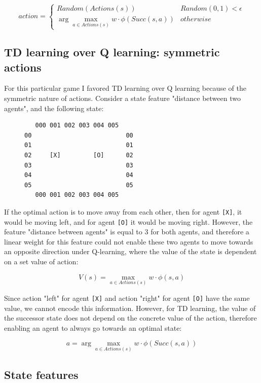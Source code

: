 \documentclass{article}
\begin{document}
\[
action = 
\begin{cases}
    Random(Actions(s)) & Random(0,1) < \epsilon \\
    \arg \max_{a\in Actions(s)} w \cdot \phi(Succ(s,a)) & otherwise
\end{cases}
\]

\subsection{TD learning over Q learning: symmetric actions}

For this particular game I favored TD learning over Q learning because of the symmetric nature of actions. Consider a state feature "distance between two agents", and the following state:

\begin{figure}[h!]
\centering
\begin{BVerbatim}
   000 001 002 003 004 005     
00                          00
01                          01
02     [X]         [O]      02
03                          03
04                          04
05                          05
   000 001 002 003 004 005 
\end{BVerbatim}
\end{figure}

If the optimal action is to move away from each other, then for agent \texttt{[X]}, it would be moving left, and for agent \texttt{[O]} it would be moving right. However, the feature "distance between agents" is equal to 3 for both agents, and therefore a linear weight for this feature could not enable these two agents to move towards an opposite direction under Q-learning, where the value of the state is dependent on a set value of action:

\[V(s) = \max_{a \in Actions(s)} w \cdot \phi (s,a)\]

Since action "left" for agent \texttt{[X]} and action "right" for agent \texttt{[O]} have the same value, we cannot encode this information. However, for TD learning, the value of the successor state does not depend on the concrete value of the action, therefore enabling an agent to always go towards an optimal state:

\[a = \arg\max_{a\in Actions(s)} w \cdot \phi(Succ(s, a))\]

\subsection{State features}
\end{document}
